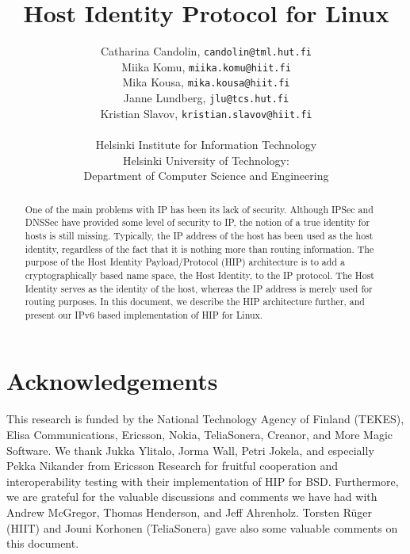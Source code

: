 \documentclass[a4paper,titlepage]{article}
\begin{document}


\title{Host Identity Protocol for Linux}
\author{Catharina Candolin, \texttt{candolin@tml.hut.fi} \\
        Miika Komu, \texttt{miika.komu@hiit.fi} \\
	Mika Kousa, \texttt{mika.kousa@hiit.fi} \\
	Janne Lundberg, \texttt{jlu@tcs.hut.fi} \\
	Kristian Slavov, \texttt{kristian.slavov@hiit.fi} \\
	\\
        Helsinki Institute for Information Technology \\       
        Helsinki University of Technology: \\
        Department of Computer Science and Engineering}
\maketitle


\fancyhf{} %
\fancyfoot[C]{ \thepage }
\pagestyle{fancy}

\tableofcontents

\newpage

\section*{Acknowledgements}

This research is funded by the National Technology Agency of Finland
(TEKES), Elisa Communications, Ericsson, Nokia, TeliaSonera, Creanor,
and More Magic Software. We thank Jukka Ylitalo, Jorma Wall, Petri
Jokela, and especially Pekka Nikander from Ericsson Research for
fruitful cooperation and interoperability testing with their
implementation of HIP for BSD. Furthermore, we are grateful for the
valuable discussions and comments we have had with Andrew McGregor,
Thomas Henderson, and Jeff Ahrenholz. Torsten R{\"u}ger (HIIT) and
Jouni Korhonen (TeliaSonera) gave also some valuable comments on this
document.

\newpage


\begin{abstract}
One of the main problems with IP has been its lack of
security. Although IPSec and DNSSec have provided some level of
security to IP, the notion of a true identity for hosts is still
missing. Typically, the IP address of the host has been used as the
host identity, regardless of the fact that it is nothing more than
routing information. The purpose of the Host Identity Payload/Protocol
(HIP) architecture is to add a cryptographically based name space, the
Host Identity, to the IP protocol. The Host Identity serves as the
identity of the host, whereas the IP address is merely used for
routing purposes.  In this document, we describe the HIP architecture
further, and present our IPv6 based implementation of HIP for Linux.
\end{abstract}







\appendix
\newpage
\pagebreak


\end{document}
